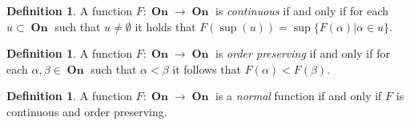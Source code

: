\documentclass[12pt]{article}
\DeclareMathOperator{\On}{\mathbf{On}}
\begin{document}
\theoremstyle{definition}

\newtheorem*{def1}{Definition}
\begin{def1}
A function $F\colon\On\to\On$ is \emph{continuous} if and only if for each $u\subset\On$ such that $u\neq\emptyset$ it holds that $F(\sup(u))=\sup\{F(\alpha)|\alpha\in u\}$.
\end{def1}

\newtheorem*{def2}{Definition}
\begin{def2}
A function $F\colon\On\to\On$ is \emph{order preserving} if and only if for each $\alpha,\beta\in\On$ such that $\alpha<\beta$ it follows that $F(\alpha)<F(\beta)$.
\end{def2}

\newtheorem*{def3}{Definition}
\begin{def3}
A function $F\colon\On\to\On$ is a \emph{normal} function if and only if $F$ is continuous and order preserving.
\end{def3}
\end{document}
